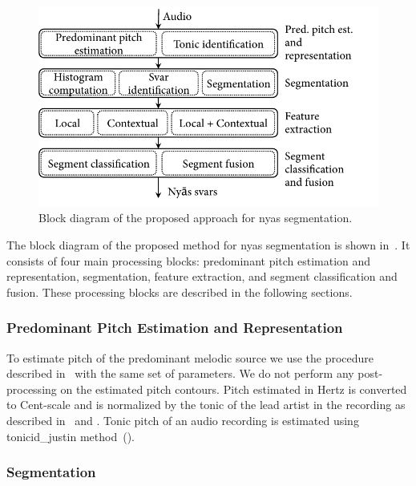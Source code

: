 {\begin{figure}
	\begin{center}
		\includegraphics[width=\figSizeEightyFive]{ch05_preprocessing/figures/BlockDiagramNyasSegmentation.pdf}
	\end{center}
	\caption{Block diagram of the proposed approach for \gls{nyas} segmentation.}
	\label{fig:bd_nyas_segmentation}
\end{figure}

The block diagram of the proposed method for \gls{nyas} segmentation is shown in~. It consists of four main processing blocks: predominant pitch estimation and representation, segmentation, feature extraction, and segment classification and fusion. These processing blocks are described in the following sections.


\subsubsection{Predominant Pitch Estimation and Representation}

To estimate pitch of the predominant melodic source we use the procedure described in~ with the same set of parameters. We do not perform any post-processing on the estimated pitch contours. Pitch estimated in Hertz is converted to Cent-scale and is normalized by the tonic of the lead artist in the recording as described in~ and . Tonic pitch of an audio recording is estimated using \acrshort{tonicid_justin} method~(). 


\subsubsection{Segmentation}
\label{sec:nyas_svara_segmentation_method}

}
